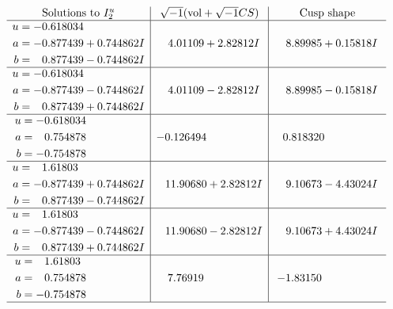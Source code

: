 \documentclass[1p]{elsarticle_modified}
\theoremstyle{definition}
\newcommand{\I}{\sqrt{-1}}
\begin{document}
$$\begin{array}{c|c|c}  
\text{Solutions to }I^u_{2}& \I (\text{vol} + \sqrt{-1}CS) & \text{Cusp shape}\\
 \hline 
\begin{aligned}
u &= -0.618034\phantom{ +0.000000I} \\
a &= -0.877439 + 0.744862 I \\
b &= \phantom{-}0.877439 - 0.744862 I\end{aligned}
 & \phantom{-}4.01109 + 2.82812 I & \phantom{-}8.89985 + 0.15818 I \\ \hline\begin{aligned}
u &= -0.618034\phantom{ +0.000000I} \\
a &= -0.877439 - 0.744862 I \\
b &= \phantom{-}0.877439 + 0.744862 I\end{aligned}
 & \phantom{-}4.01109 - 2.82812 I & \phantom{-}8.89985 - 0.15818 I \\ \hline\begin{aligned}
u &= -0.618034\phantom{ +0.000000I} \\
a &= \phantom{-}0.754878\phantom{ +0.000000I} \\
b &= -0.754878\phantom{ +0.000000I}\end{aligned}
 & -0.126494\phantom{ +0.000000I} & \phantom{-}0.818320\phantom{ +0.000000I} \\ \hline\begin{aligned}
u &= \phantom{-}1.61803\phantom{ +0.000000I} \\
a &= -0.877439 + 0.744862 I \\
b &= \phantom{-}0.877439 - 0.744862 I\end{aligned}
 & \phantom{-}11.90680 + 2.82812 I & \phantom{-}9.10673 - 4.43024 I \\ \hline\begin{aligned}
u &= \phantom{-}1.61803\phantom{ +0.000000I} \\
a &= -0.877439 - 0.744862 I \\
b &= \phantom{-}0.877439 + 0.744862 I\end{aligned}
 & \phantom{-}11.90680 - 2.82812 I & \phantom{-}9.10673 + 4.43024 I \\ \hline\begin{aligned}
u &= \phantom{-}1.61803\phantom{ +0.000000I} \\
a &= \phantom{-}0.754878\phantom{ +0.000000I} \\
b &= -0.754878\phantom{ +0.000000I}\end{aligned}
 & \phantom{-}7.76919\phantom{ +0.000000I} & -1.83150\phantom{ +0.000000I}\\
 \hline 
 \end{array}$$\newpage
\end{document}
